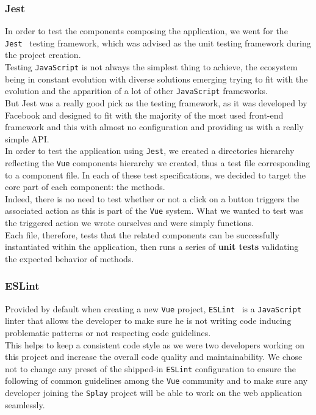 \documentclass{eplmastersthesis}
\begin{document}
        \subsubsection{Jest}

          In order to test the components composing the application, we
          went for the \texttt{Jest}~\cite{jest} testing framework, which was advised
          as the unit testing framework during the project creation.\\

          Testing \texttt{JavaScript} is not always the simplest thing to achieve, the
          ecosystem being in constant evolution with diverse solutions emerging
          trying to fit with the evolution and the apparition of a lot of
          other \texttt{JavaScript} frameworks.\\
          But Jest was a really good pick as the testing framework, as it was
          developed by Facebook and designed to fit with the majority of the
          most used front-end framework and this with almost no configuration and
          providing us with a really simple API.\\

          In order to test the application using \texttt{Jest}, we created a directories
          hierarchy reflecting the \texttt{Vue} components hierarchy we created, thus
          a test file corresponding to a component file. In each of these
          test specifications, we decided to target the core part of each
          component: the methods.\\
          Indeed, there is no need to test whether or not a click on a button
          triggers the associated action as this is part of the \texttt{Vue} system. What
          we wanted to test was the triggered action we wrote ourselves and
          were simply functions.\\
          Each file, therefore, tests that the related components can be
          successfully instantiated within the application, then runs a series
          of \textbf{unit tests} validating the expected behavior of methods.

        \subsubsection{ESLint}

          Provided by default when creating a new \texttt{Vue} project, \texttt{ESLint}~\cite{eslint}
          is a \texttt{JavaScript} linter that allows the developer to
          make sure he is not writing code inducing problematic patterns or not
          respecting code guidelines.\\
          This helps to keep a consistent code style as we were two developers working
          on this project and increase the overall code quality and
          maintainability. We chose not to change any preset of the shipped-in
          \texttt{ESLint} configuration to ensure the following of common guidelines among the \texttt{Vue}
          community and to make sure any developer joining the \texttt{Splay} project will
          be able to work on the web application seamlessly.
\end{document}
